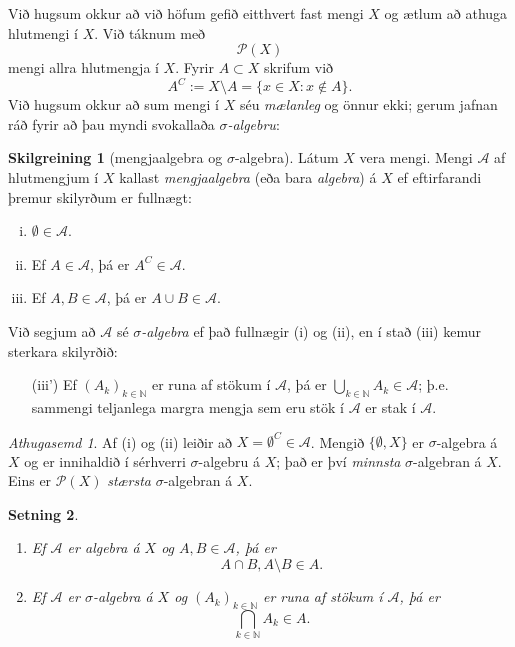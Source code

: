 \documentclass[a4paper,icelandic,11pt]{book}
\theoremstyle{plain}      \newtheorem{setn}{Setning}[chapter]
\theoremstyle{definition} \newtheorem{skilgr}[setn]{Skilgreining}
\theoremstyle{remark}     \newtheorem*{ath}{Athugasemd}
\newcommand{\N}{\mathbb N}
\begin{document}
Við hugsum okkur að við höfum gefið eitthvert fast mengi $X$ og ætlum
að athuga hlutmengi í $X$. Við táknum með
\[
\mathcal P(X)
\]
mengi allra hlutmengja í $X$. Fyrir $A\subset X$
skrifum við
\[
A^{C}:=X\setminus A= \{x\in X : x\notin A\}.
\]
Við hugsum okkur að sum mengi í $X$ séu
\emph{mælanleg} og önnur ekki;
gerum jafnan ráð fyrir að þau myndi svokallaða
\emph{$\sigma$-algebru}:
\begin{skilgr}[mengjaalgebra og $\sigma$-algebra]
  Látum $X$ vera mengi. Mengi $\mathcal A$ af hlutmengjum í $X$
  kallast \emph{mengjaalgebra} (eða bara
  \emph{algebra}) á $X$ ef eftirfarandi þremur
  skilyrðum er fullnægt:
  \begin{enumerate}[(i)]
  \item $\emptyset\in\mathcal A$.
  \item Ef $A\in\mathcal A$, þá er $A^{C}\in\mathcal A$.
  \item Ef $A,B\in\mathcal A$, þá er $A\cup B\in\mathcal A$.
  \end{enumerate}
  Við segjum að $\mathcal A$ sé \emph{$\sigma$-algebra} ef það
  fullnægir (i) og (ii), en í stað (iii) kemur sterkara skilyrðið:
  \begin{enumerate}
  \item [(iii')] Ef $(A_{k})_{k\in\N}$ er runa af stökum í
    $\mathcal{A}$, þá er $\bigcup_{k\in\N}A_{k}\in\mathcal A$;
    þ.e. sammengi teljanlega margra mengja sem eru stök í $\mathcal A$
    er stak í $\mathcal A$.
  \end{enumerate}
\end{skilgr}
\begin{ath}
  Af (i) og (ii) leiðir að $X=\emptyset^{C}\in\mathcal A$. Mengið
  $\{\emptyset,X\}$ er $\sigma$-algebra á $X$ og er innihaldið í
  sérhverri $\sigma$-algebru á $X$; það er því
  \emph{minnsta}
  $\sigma$-algebran á $X$. Eins er $\mathcal P(X)$
  \emph{stærsta}
  $\sigma$-algebran á $X$.
\end{ath}
\begin{setn}
  \begin{enumerate}[(1)]
  \item Ef $\mathcal A$ er algebra á $X$ og $A,B\in\mathcal A$, þá er
    \[
    A\cap B,A\setminus B\in A.
    \]
  \item Ef $\mathcal A$ er $\sigma$-algebra á $X$ og $(A_{k})_{k\in\N}$
    er runa af stökum í $\mathcal A$, þá er
    \[
    \bigcap_{k\in\N} A_{k}\in A.
    \]
  \end{enumerate}
\end{setn}
\end{document}
